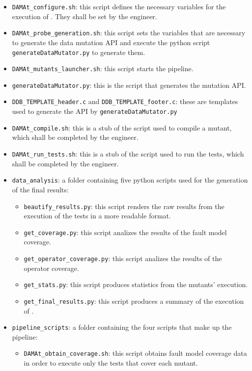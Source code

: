 \begin{itemize}
	\item \texttt{DAMAt\_configure.sh}: this script defines the necessary variables for the execution of \DAMA. They shall be set by the engineer.
	\item \texttt{DAMAt\_probe\_generation.sh}: this script sets the variables that are necessary to generate the data mutation API and execute the python script \texttt{generateDataMutator.py} to generate them.
	\item \texttt{DAMAt\_mutants\_launcher.sh}: this script starts the \DAMA pipeline.
	\item \texttt{generateDataMutator.py}: this is the script that generates the \DAMA mutation API.
	\item \texttt{DDB\_TEMPLATE\_header.c} and \texttt{DDB\_TEMPLATE\_footer.c}: these are templates used to generate the \DAMA API by \texttt{generateDataMutator.py}
	\item \texttt{DAMAt\_compile.sh}: this is a stub of the script used to compile a mutant, which shall be completed by the engineer.
	\item \texttt{DAMAt\_run\_tests.sh}: this is a stub of the script used to run the tests, which shall be completed by the engineer.
	\item \texttt{data\_analysis}: a folder containing five python scripts used for the generation of the final results:
	\begin{itemize}
	  \item \texttt{beautify\_results.py}: this script renders the raw results from the execution of the tests in a more readable format.
	  \item \texttt{get\_coverage.py}: this script analizes the results of the fault model coverage.
	  \item \texttt{get\_operator\_coverage.py}: this script analizes the results of the operator coverage.
	  \item \texttt{get\_stats.py}: this script produces statistics from the mutants' execution.
		\item \texttt{get\_final\_results.py}: this script produces a summary of the execution of \DAMA.
	\end{itemize}
	\item \texttt{pipeline\_scripts}: a folder containing the four scripts that make up the \DAMA pipeline:
	\begin{itemize}
		\item \texttt{DAMAt\_obtain\_coverage.sh}: this script obtains fault model coverage data in order to execute only the tests that cover each mutant.

\end{itemize}
\end{itemize}
